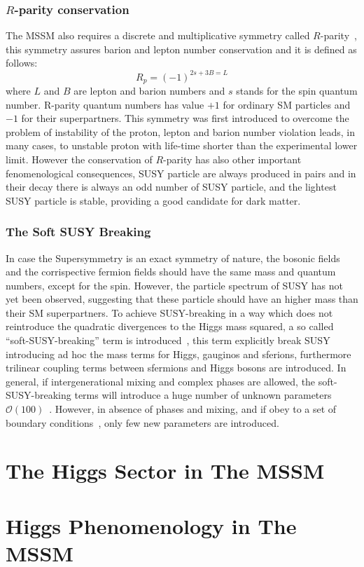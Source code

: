 \subsubsection{$R$-parity conservation}
The MSSM also requires a discrete and multiplicative symmetry called $R$-parity~\cite{djuadi12}, this symmetry assures barion and lepton number 
conservation and it is defined as follows:
\begin{equation}
R_p = (-1)^{2s+3B=L}
\end{equation}
where $L$ and $B$ are lepton and barion numbers and $s$ stands for the spin quantum number. R-parity quantum numbers has value $+1$ for ordinary
SM particles and $-1$ for their superpartners. This symmetry was first introduced to overcome the problem of instability of the proton,
lepton and barion number violation leads, in many cases, 
to unstable proton with life-time shorter than the experimental lower limit. However the conservation of $R$-parity has also other important 
fenomenological consequences, SUSY particle are always produced in pairs and in their decay there is always an odd number of SUSY particle, 
and the lightest SUSY particle is stable, providing a good candidate for dark matter.


\subsubsection{The Soft SUSY Breaking}
In case the Supersymmetry is an exact symmetry of nature, the bosonic fields and the corrispective fermion fields should have the same mass 
and quantum numbers, except for the spin. However, the particle spectrum of SUSY has not yet been observed, suggesting that these particle
 should have an higher mass than their SM superpartners. 
To achieve SUSY-breaking in a way which does not reintroduce the quadratic divergences to the Higgs mass squared, a so called ``soft-SUSY-breaking''
term is introduced~\cite{djuadipage5orBetterPage12}, this term explicitly break SUSY introducing ad hoc the mass terms for Higgs, gauginos and
sferions, furthermore  trilinear coupling terms between sfermions and Higgs bosons are introduced. In general, if intergenerational mixing and 
complex phases are allowed, the soft-SUSY-breaking terms will introduce a huge number of unknown parameters $\mathcal{O}(100)$~\cite{djuadiPage5}.
However, in absence of phases and  mixing, and if obey to a set of boundary conditions~\cite{djuadi5}, only few new parameters are introduced.




\section{The Higgs Sector in The MSSM }

\section{Higgs Phenomenology in The MSSM}


